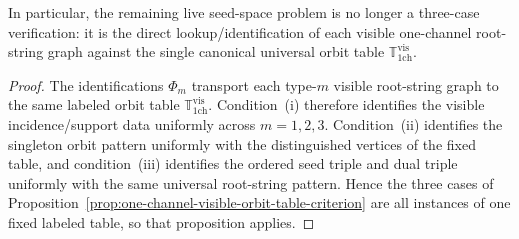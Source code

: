 \begin{proposition}
In particular, the remaining live seed-space problem is no longer a
three-case verification: it is the direct lookup/identification of each
visible one-channel root-string graph against the single canonical
universal orbit table
$\mathbb{T}_{\mathrm{1ch}}^{\mathrm{vis}}$.
\end{proposition}

\begin{proof}
The identifications $\Phi_m$ transport each type-$m$ visible
root-string graph to the same labeled orbit table
$\mathbb{T}_{\mathrm{1ch}}^{\mathrm{vis}}$.  Condition~\textup{(i)}
therefore identifies the visible incidence/support data uniformly
across
$m=1,2,3$.  Condition~\textup{(ii)} identifies the singleton orbit
pattern uniformly with the distinguished vertices of the fixed table,
and condition~\textup{(iii)} identifies the ordered seed triple and
dual triple uniformly with the same universal root-string pattern.
Hence the three cases of
Proposition~\ref{prop:one-channel-visible-orbit-table-criterion} are
all instances of one fixed labeled table, so that proposition applies.
\end{proof}

